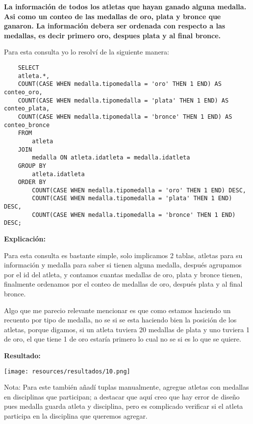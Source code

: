 \textbf{La información de todos los atletas que hayan ganado alguna medalla. Asi como un conteo de las medallas
de oro, plata y bronce que ganaron. La información debera ser ordenada con respecto a las medallas, es
decir primero oro, despues plata y al final bronce.}\vspace{.3cm}


Para esta consulta yo lo resolví de la siguiente manera: \vspace{.3cm}

\begin{lstlisting}
    SELECT 
    atleta.*,
    COUNT(CASE WHEN medalla.tipomedalla = 'oro' THEN 1 END) AS conteo_oro,
    COUNT(CASE WHEN medalla.tipomedalla = 'plata' THEN 1 END) AS conteo_plata,
    COUNT(CASE WHEN medalla.tipomedalla = 'bronce' THEN 1 END) AS conteo_bronce
    FROM 
        atleta
    JOIN 
        medalla ON atleta.idatleta = medalla.idatleta
    GROUP BY 
        atleta.idatleta
    ORDER BY 
        COUNT(CASE WHEN medalla.tipomedalla = 'oro' THEN 1 END) DESC,
        COUNT(CASE WHEN medalla.tipomedalla = 'plata' THEN 1 END) DESC,
        COUNT(CASE WHEN medalla.tipomedalla = 'bronce' THEN 1 END) DESC;
\end{lstlisting}

\textbf{Explicación:} \vspace{.3cm}

Para esta consulta es bastante simple, solo implicamos 2 tablas, atletas para su información y medalla para saber si tienen alguna medalla, después agrupamos por el id del atleta, y contamos cuantas medallas de oro, plata y bronce tienen, finalmente ordenamos por el conteo de medallas de oro, después plata y al final bronce. \vspace{.3cm}

Algo que me parecio relevante mencionar es que como estamos haciendo un recuento por tipo de medalla, no se si se esta haciendo bien la posición de los atletas, porque digamos, si un atleta tuviera 20 medallas de plata y uno tuviera 1 de oro, el que tiene 1 de oro estaría primero lo cual no se si es lo que se quiere. \vspace{.3cm}


\textbf{Resultado:}
\begin{center}
    \texttt{[image: resources/resultados/10.png]}
\end{center}   

Nota: Para este también añadí tuplas manualmente, agregue atletas con medallas en disciplinas que participan; a destacar que aquí creo que hay error de diseño pues medalla guarda atleta y disciplina, pero es complicado verificar si el atleta participa en la disciplina que queremos agregar. \vspace{.3cm}
